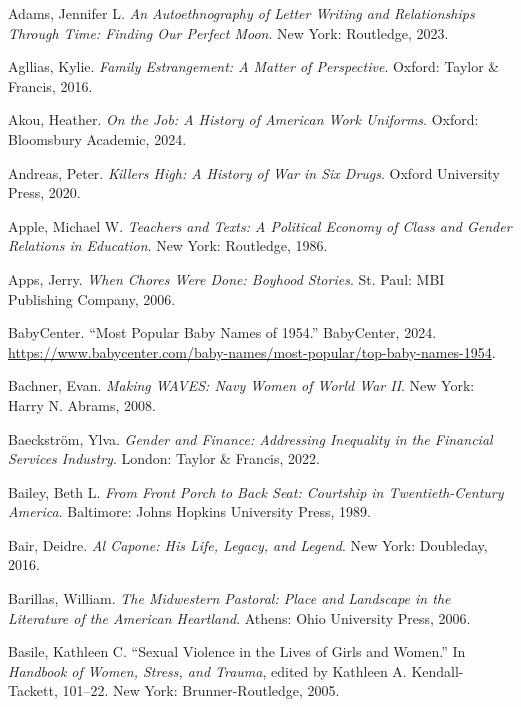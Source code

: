 \documentclass[
  letterpaper,
]{book}
\newlength{\cslhangindent}
\newenvironment{CSLReferences}[2] %
 {\begin{list}{}{%
  \setlength{\itemindent}{0pt}
  \setlength{\leftmargin}{0pt}
  \setlength{\parsep}{0pt}
  \ifodd #1
   \setlength{\leftmargin}{\cslhangindent}
   \setlength{\itemindent}{-1\cslhangindent}
  \fi
  \setlength{\itemsep}{#2\baselineskip}}}
 {\end{list}}
\begin{document}
\label{refs}
\begin{CSLReferences}{1}{0}
Adams, Jennifer L. \emph{An Autoethnography of Letter Writing and
Relationships Through Time: Finding Our Perfect Moon}. New York:
Routledge, 2023.

Agllias, Kylie. \emph{Family Estrangement: A Matter of Perspective}.
Oxford: Taylor \& Francis, 2016.

Akou, Heather. \emph{On the Job: A History of American Work Uniforms}.
Oxford: Bloomsbury Academic, 2024.

Andreas, Peter. \emph{Killers High: A History of War in Six Drugs}.
Oxford University Press, 2020.

Apple, Michael W. \emph{Teachers and Texts: A Political Economy of Class
and Gender Relations in Education}. New York: Routledge, 1986.

Apps, Jerry. \emph{When Chores Were Done: Boyhood Stories}. St. Paul:
MBI Publishing Company, 2006.

BabyCenter. {``Most Popular Baby Names of 1954.''} BabyCenter, 2024.
\url{https://www.babycenter.com/baby-names/most-popular/top-baby-names-1954}.

Bachner, Evan. \emph{Making WAVES: Navy Women of World War II}. New
York: Harry N. Abrams, 2008.

Baeckström, Ylva. \emph{Gender and Finance: Addressing Inequality in the
Financial Services Industry}. London: Taylor \& Francis, 2022.

Bailey, Beth L. \emph{From Front Porch to Back Seat: Courtship in
Twentieth-Century America}. Baltimore: Johns Hopkins University Press,
1989.

Bair, Deidre. \emph{Al Capone: His Life, Legacy, and Legend}. New York:
Doubleday, 2016.

Barillas, William. \emph{The Midwestern Pastoral: Place and Landscape in
the Literature of the American Heartland}. Athens: Ohio University
Press, 2006.

Basile, Kathleen C. {``Sexual Violence in the Lives of Girls and
Women.''} In \emph{Handbook of Women, Stress, and Trauma}, edited by
Kathleen A. Kendall-Tackett, 101--22. New York: Brunner-Routledge, 2005.


\end{CSLReferences}
\end{document}
